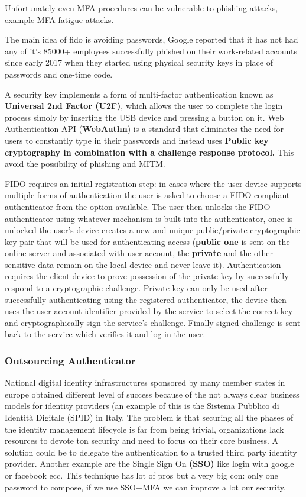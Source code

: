     Unfortunately even MFA procedures can be vulnerable to phishing attacks, example MFA fatigue attacks.
    
    The main idea of fido is avoiding passwords, Google reported that it has not had any of it's 85000+ employees successfully phished on their work-related accounts since early 2017 when they started using physical security keys in place of passwords and one-time code.
    
    A security key implements a form of multi-factor authentication known as \textbf{Universal 2nd Factor (U2F)}, which allows the user to complete the login process simoly by inserting the USB device and pressing a button on it. Web Authentication API (\textbf{WebAuthn}) is a standard that eliminates the need for users to constantly type in their passwords and instead uses \textbf{Public key cryptography in combination with a challenge response protocol.} This avoid the possibility of phishing and MITM.
    
    FIDO requires an initial registration step: in cases where the user device supports multiple forms of authentication the user is asked to choose a FIDO compliant authenticator from the option available. The user then unlocks the FIDO authenticator using whatever mechanism is built into the authenticator, once is unlocked the user's device creates a new and unique public/private cryptographic key pair that will be used for authenticating access (\textbf{public one} is sent on the online server and associated with user account, the \textbf{private} and the other sensitive data remain on the local device and never leave it). Authentication requires the client device to prove possession of the private key by successfully respond to a cryptographic challenge. Private key can only be used after successfully authenticating using the registered authenticator, the device then uses the user account identifier provided by the service to select the correct key and cryptographically sign the service's challenge. Finally signed challenge is sent back to the service which verifies it and log in the user.
    
    \subsubsection{Outsourcing Authenticator}
    National digital identity infrastructures sponsored by many member states in europe obtained different level of success because of the not always clear business models for identity providers (an example of this is the Sistema Pubblico di Identità Digitale (SPID) in Italy. The problem is that securing all the phases of the identity management lifecycle is far from being trivial, organizations lack resources to devote ton security and need to focus on their core business. A solution could be to delegate the authentication to a trusted third party identity provider. Another example are the Single Sign On \textbf{(SSO)} like login with google or facebook ecc. This technique has lot of pros but a very big con: only one password to compose, if we use SSO+MFA we can improve a lot our security.